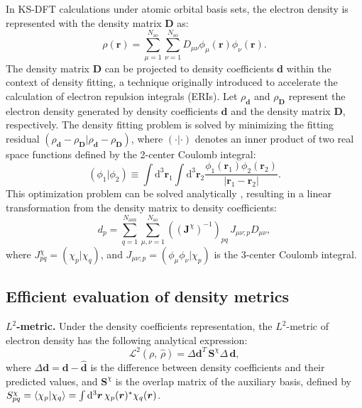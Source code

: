 \documentclass[%
reprint,
superscriptaddress,
bibnotes,
amsmath,amssymb,
aps,
floatfix, %
]{revtex4-2}
\begin{document}
\noindent In KS-DFT calculations under atomic orbital basis sets, the electron density is represented with the density matrix $\mathbf{D}$ as:
\begin{equation}
  \rho(\bm{r}) = \sum_{\mu=1}^{N_\text{ao}} \sum_{\nu=1}^{N_\text{ao}} D_{\mu\nu} \phi_\mu(\bm{r}) \phi_\nu(\bm{r}).
\end{equation}
The density matrix $\mathbf{D}$ can be projected to density coefficients $\mathbf{d}$ within the context of density fitting, a technique originally introduced to accelerate the calculation of electron repulsion integrals (ERIs). Let $\rho_\mathbf{d}$ and $\rho_\mathbf{D}$ represent the electron density generated by density coefficients $\mathbf{d}$ and the density matrix $\mathbf{D}$, respectively. The density fitting problem is solved by minimizing the fitting residual $(\rho_\mathbf{d} - \rho_\mathbf{D}|\rho_\mathbf{d} - \rho_\mathbf{D})$, where $(\cdot | \cdot)$ denotes an inner product of two real space functions defined by the 2-center Coulomb integral:
\begin{equation}
  (\phi_1 | \phi_2) \equiv \int \mathrm{d}^3\bm{r}_1 \int \mathrm{d}^3\bm{r}_2 \frac{\phi_1(\bm{r}_1) \phi_2(\bm{r}_2)}{|\bm{r}_1-\bm{r}_2|}.
  \label{eq:inner}
\end{equation}
This optimization problem can be solved analytically \cite{Dunlap2010}, resulting in a linear transformation from the density matrix to density coefficients:
\begin{equation}
  d_p = \sum_{q=1}^{N_\text{aux}}\sum_{\mu,\nu = 1}^{N_\text{ao}} \left((\mathbf{J}^\chi)^{-1}\right)_{pq}\, J_{\mu\nu;p} D_{\mu\nu},
  \label{eq:df}
\end{equation}
where $J^\chi_{pq} = (\chi_p|\chi_q)$, 
and $J_{\mu\nu;p} = (\phi_\mu \phi_\nu|\chi_p)$ is the 3-center Coulomb integral. 

\subsection{\label{sec:evaluate}Efficient evaluation of density metrics}
\noindent \textbf{$L^2$-metric.} Under the density coefficients representation, the $L^2$-metric of electron density has the following analytical expression:
\begin{equation}
  \mathcal{L}^2(\rho,\,\hat{\rho}) = \Delta \mathbf{d}^T \, \mathbf{S}^\chi \Delta \, \mathbf{d},
  \label{eq:l2}
\end{equation}
where $\Delta \mathbf{d} = \mathbf{d} - \hat{\mathbf{d}}$ is the difference between density coefficients and their predicted values, and $\mathbf{S}^\chi$ is the overlap matrix of the auxiliary basis, defined by $S^\chi_{pq} = \braket{\chi_p|\chi_q} = \int  \mathrm{d}^3\bm{r}\, \chi_p(\bm{r})^*\chi_q(\bm{r})$. 
\end{document}
